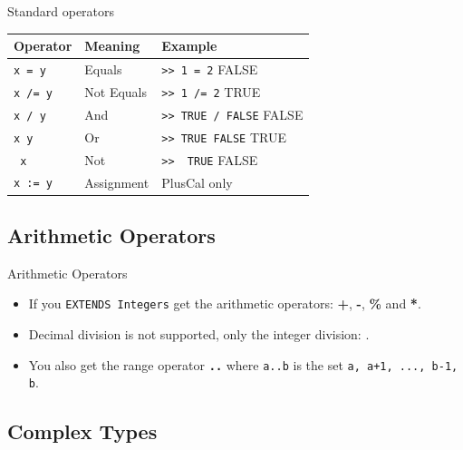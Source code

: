 \documentclass[10pt]{beamer}
\begin{document}
\begin{frame}{Standard operators}
  \begin{table}
    \begin{tabular}{@{} p{2cm}lp{3cm} @{}}
      \toprule
      Operator & Meaning & Example\\
      \midrule
      \texttt{x = y} & Equals & \texttt{>> 1 = 2} \newline FALSE \\
      \texttt{x /= y} & Not Equals & \texttt{>> 1 /= 2} \newline TRUE\\
      \texttt{x /\ y} & And & \texttt{>> TRUE /\ FALSE} \newline FALSE\\
      \texttt{x \/ y} & Or & \texttt{>> TRUE \/ FALSE} \newline TRUE\\
      \texttt{~x} & Not & \texttt{>> ~TRUE} \newline FALSE\\      
      \texttt{x := y} & Assignment & PlusCal only\\
      \bottomrule
    \end{tabular}
  \end{table}
\end{frame}

\subsection{Arithmetic Operators}

\begin{frame}{Arithmetic Operators}
  \begin{itemize}
    \item  If you \texttt{EXTENDS Integers} get the arithmetic operators: \textbf{+}, \textbf{-}, \textbf{\%} and \textbf{*}.
    \item  Decimal division is not supported, only the integer division: \textbf{\texttt{\div}}.
    \item You also get the range operator \textbf{\texttt{..}} where \texttt{a..b} is the set \texttt{{a, a+1, ..., b-1, b}}.
  \end{itemize}
\end{frame}

\subsection{Complex Types}
\end{document}
